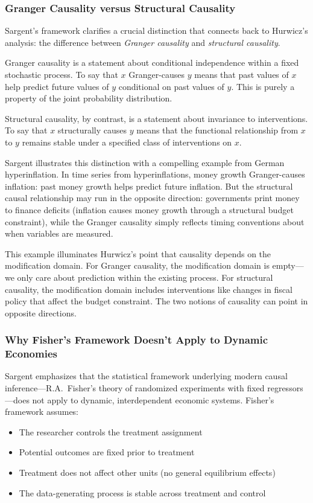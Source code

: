 \documentclass[12pt]{article}
\begin{document}
\subsubsection{Granger Causality versus Structural Causality}

Sargent's framework clarifies a crucial distinction that connects back to Hurwicz's analysis: the difference between \emph{Granger causality} and \emph{structural causality}.

Granger causality is a statement about conditional independence within a fixed stochastic process. To say that $x$ Granger-causes $y$ means that past values of $x$ help predict future values of $y$ conditional on past values of $y$. This is purely a property of the joint probability distribution.

Structural causality, by contrast, is a statement about invariance to interventions. To say that $x$ structurally causes $y$ means that the functional relationship from $x$ to $y$ remains stable under a specified class of interventions on $x$.

Sargent illustrates this distinction with a compelling example from German hyperinflation. In time series from hyperinflations, money growth Granger-causes inflation: past money growth helps predict future inflation. But the structural causal relationship may run in the opposite direction: governments print money to finance deficits (inflation causes money growth through a structural budget constraint), while the Granger causality simply reflects timing conventions about when variables are measured.

This example illuminates Hurwicz's point that causality depends on the modification domain. For Granger causality, the modification domain is empty---we only care about prediction within the existing process. For structural causality, the modification domain includes interventions like changes in fiscal policy that affect the budget constraint. The two notions of causality can point in opposite directions.

\subsubsection{Why Fisher's Framework Doesn't Apply to Dynamic Economies}

Sargent emphasizes that the statistical framework underlying modern causal inference---R.A.\ Fisher's theory of randomized experiments with fixed regressors---does not apply to dynamic, interdependent economic systems. Fisher's framework assumes:
\begin{itemize}
\item The researcher controls the treatment assignment
\item Potential outcomes are fixed prior to treatment
\item Treatment does not affect other units (no general equilibrium effects)
\item The data-generating process is stable across treatment and control
\end{itemize}
\end{document}
